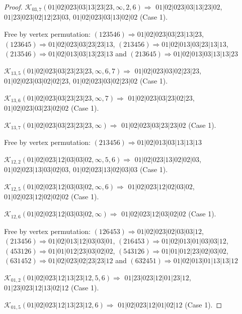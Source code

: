 \documentclass[12pt]{article}
\theoremstyle{plain}
\theoremstyle{definition}
\theoremstyle{remark}
\newcommand{\fancy}[1]{\mathcal{#1}}
\def\K{\fancy{K}}
\begin{document}
\begin{proof}
	$\K_{03,7}(01|02|023|03|13|23|23,\infty,2, 6)\Rightarrow $ $01|02|023|03|13|23|02$, $01|23|023|02|12|23|03$, $01|02|023|03|13|02|02$ (Case 1).
	
	
	
	Free by vertex permutation: $(1 2 3 5 4 6)\Rightarrow 01|02|023|03|23|13|23$, $(1 2 3 6 4 5)\Rightarrow 01|02|023|03|23|23|13$, $(2 1 3 4 5 6)\Rightarrow 01|02|013|03|23|13|13$, $(2 1 3 5 4 6)\Rightarrow 01|02|013|03|13|23|13$ and $(2 1 3 6 4 5)\Rightarrow 01|02|013|03|13|13|23$
	
	
	
	\bigskip
	
	$\K_{13,5}(01|02|023|03|23|23|23,\infty,6, 7)\Rightarrow $ $01|02|023|03|02|23|23$, $01|02|023|03|02|02|23$, $01|02|023|03|02|23|02$ (Case 1).
	
	$\K_{13,6}(01|02|023|03|23|23|23,\infty,7)\Rightarrow $ $01|02|023|03|23|02|23$, $01|02|023|03|23|02|02$ (Case 1).
	
	$\K_{13,7}(01|02|023|03|23|23|23,\infty)\Rightarrow $ $01|02|023|03|23|23|02$ (Case 1).
	
	
	
	Free by vertex permutation: $(2 1 3 4 5 6)\Rightarrow 01|02|013|03|13|13|13$
	
	
	
	\bigskip
	
	$\K_{12,2}(01|02|023|12|03|03|02,\infty,5, 6)\Rightarrow $ $01|02|023|13|02|02|03$, $01|02|023|13|03|02|03$, $01|02|023|13|02|03|03$ (Case 1).
	
	$\K_{12,5}(01|02|023|12|03|03|02,\infty,6)\Rightarrow $ $01|02|023|12|02|03|02$, $01|02|023|12|02|02|02$ (Case 1).
	
	$\K_{12,6}(01|02|023|12|03|03|02,\infty)\Rightarrow $ $01|02|023|12|03|02|02$ (Case 1).
	
	
	
	Free by vertex permutation: $(1 2 6 4 5 3)\Rightarrow 01|02|023|02|03|03|12$, $(2 1 3 4 5 6)\Rightarrow 01|02|013|12|03|03|01$, $(2 1 6 4 5 3)\Rightarrow 01|02|013|01|03|03|12$, $(4 5 3 1 2 6)\Rightarrow 01|01|012|23|03|02|02$, $(5 4 3 1 2 6)\Rightarrow 01|01|012|23|02|03|02$, $(6 3 1 4 5 2)\Rightarrow 01|02|023|02|23|23|12$ and $(6 3 2 4 5 1)\Rightarrow 01|02|013|01|13|13|12$
	
	
	
	\bigskip
	
	$\K_{01,2}(01|02|023|12|13|23|12,5, 6)\Rightarrow $ $01|23|023|12|01|23|12$, $01|23|023|12|13|02|12$ (Case 1).
	
	$\K_{01,5}(01|02|023|12|13|23|12,6)\Rightarrow $ $01|02|023|12|01|02|12$ (Case 1).
	

\end{proof}
\end{document}
